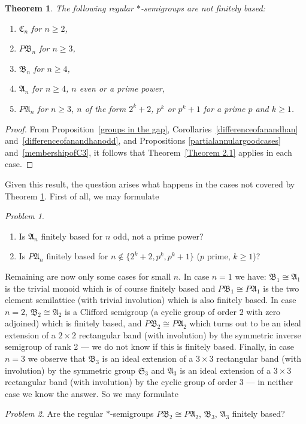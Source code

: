 \documentclass[preprint,1p,times]{elsarticle}
\numberwithin{equation}{section}
\newtheorem{Thm}{Theorem}[section]
\theoremstyle{remark}
\newtheorem{Problem}{Problem}[section]
\def\A{\mathfrak{A}}
\def\C{\mathfrak{C}}
\def\B{\mathfrak{B}}
\def\Sim{\mathfrak{S}}
\begin{document}
\begin{Thm}
\label{mainresultpartitionsemigroups} The following regular $*$-semigroups are not finitely based:
\begin{enumerate}
\item $\C_n$  for $n\ge 2$,
\item $P\B_n$ for $n\ge 3$,
\item $\B_n$ for $n\ge 4$,
\item $\A_n$ for $n\ge 4$, $n$ even or a prime power,
\item $P\A_n$ for $n\ge 3$, $n$ of the form $2^k+2$, $p^k$ or $p^k+1$ for
a  prime $p$ and $k\ge 1$.
\end{enumerate}
\end{Thm}

\begin{proof}
From Proposition~\ref{groups in the gap}, Corollaries~\ref{differenceofanandhan} and~\ref{differenceofanandhanodd}, and
Propositions \ref{partialannulargoodcases} and~\ref{membershipofC3}, it follows that Theorem~\ref{Theorem 2.1} applies
in each case.
\end{proof}

Given this result, the question arises what happens in the cases not covered by Theorem
\ref{mainresultpartitionsemigroups}. First of all, we may formulate
\begin{Problem}
\begin{enumerate}
\item  Is $\A_n$ finitely based for $n$ odd, not a prime power?
\item Is $P\A_n$ finitely based for $n\notin\{2^k+2,p^k,p^k+1\}$
($p$  prime, $k\ge 1$)?
\end{enumerate}
\end{Problem}

Remaining are now only some cases for small $n$. In case $n=1$ we have: $\B_1\cong \A_1$ is the trivial monoid which is
of course finitely based and $P\B_1\cong P\A_1$ is the two element semilattice (with trivial involution) which is also
finitely based. In case $n=2$, $\B_2\cong \A_2$ is a Clifford semigroup (a cyclic group of order $2$ with zero
adjoined) which is finitely based, and $P\B_2\cong P\A_2$ which turns out to be an ideal extension of a $2\times 2$
rectangular band (with involution) by the symmetric inverse semigroup of rank 2 --- we do not know if this is finitely
based. Finally, in case $n=3$ we observe that $\B_3$ is an ideal extension of a $3\times 3$ rectangular band (with
involution) by the symmetric group $\Sim_3$ and $\A_3$ is an ideal extension of a $3\times 3$ rectangular band (with
involution) by the cyclic group of order $3$ --- in neither case we know the answer.  So we may formulate
\begin{Problem}
Are the regular $*$-semigroups $P\B_2\cong P\A_2$, $\B_3$, $\A_3$ finitely based?
\end{Problem}
\end{document}
